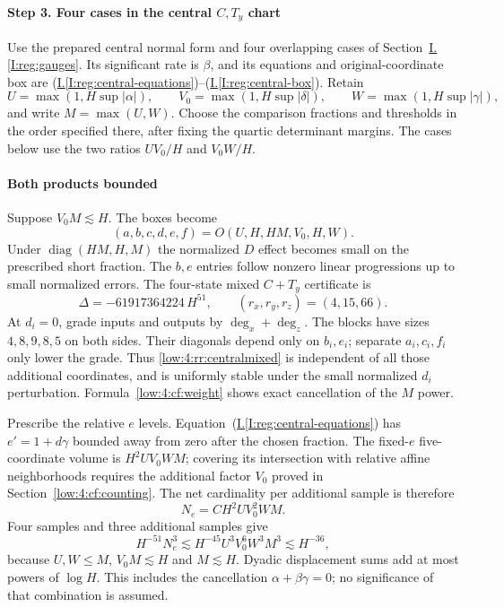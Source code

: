 \documentclass[11pt]{amsart}
\theoremstyle{definition}
\theoremstyle{remark}
\DeclareMathOperator{\diag}{diag}
\numberwithin{equation}{section}
\newcommand{\partIref}[1]{\hyperref[I:#1]{I.\ref*{I:#1}}}
\newcommand{\partIeqref}[1]{\textup{(\partIref{#1})}}
\begin{document}
\paragraph{Step 3. Four cases in the central \texorpdfstring{$C,T_y$}{C,Ty} chart}
Use the prepared central normal form and four overlapping cases of Section~\partIref{reg:gauges}. Its significant rate is $\beta$, and its equations and original-coordinate box are \partIeqref{reg:central-equations}--\partIeqref{reg:central-box}. Retain
\[
U=\max(1,H\sup|\alpha|),\qquad V_0=\max(1,H\sup|\delta|),\qquad W=\max(1,H\sup|\gamma|),
\]
and write $M=\max(U,W)$. Choose the comparison fractions and thresholds in the order specified there, after fixing the quartic determinant margins. The cases below use the two ratios $UV_0/H$ and $V_0W/H$.

\paragraph{Both products bounded}
Suppose $V_0M\lesssim H$. The boxes become
\[
(a,b,c,d,e,f)=O(U,H,HM,V_0,H,W).
\]
Under $\diag(HM,H,M)$ the normalized $D$ effect becomes small on the prescribed short fraction. The $b,e$ entries follow nonzero linear progressions up to small normalized errors. The four-state mixed $C+T_y$ certificate is
\begin{equation}\label{low:4:rr:centralmixed}
\Delta=-61917364224\,H^{51},\qquad (r_x,r_y,r_z)=(4,15,66).
\end{equation}
At $d_i=0$, grade inputs and outputs by $\deg_x+\deg_z$. The blocks have sizes $4,8,9,8,5$ on both sides. Their diagonals depend only on $b_i,e_i$; separate $a_i,c_i,f_i$ only lower the grade. Thus \eqref{low:4:rr:centralmixed} is independent of all those additional coordinates, and is uniformly stable under the small normalized $d_i$ perturbation. Formula~\eqref{low:4:cf:weight} shows exact cancellation of the $M$ power.

Prescribe the relative $e$ levels. Equation~\partIeqref{reg:central-equations} has $e'=1+d\gamma$ bounded away from zero after the chosen fraction. The fixed-$e$ five-coordinate volume is $H^2UV_0WM$; covering its intersection with relative affine neighborhoods requires the additional factor $V_0$ proved in Section~\ref{low:4:cf:counting}. The net cardinality per additional sample is therefore
\[
N_e=CH^2UV_0^2WM.
\]
Four samples and three additional samples give
\[
H^{-51}N_e^3\lesssim H^{-45}U^3V_0^6W^3M^3\lesssim H^{-36},
\]
because $U,W\le M$, $V_0M\lesssim H$ and $M\lesssim H$. Dyadic displacement sums add at most powers of $\log H$. This includes the cancellation $\alpha+\beta\gamma=0$; no significance of that combination is assumed.
\end{document}
